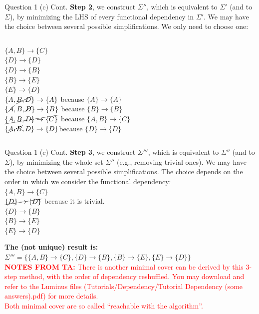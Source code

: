 \begin{frame}[fragile]{Question 1 (c) Cont.}
	\textbf{Step 2}, we construct $\Sigma''$, which is equivalent to $\Sigma'$ (and to $\Sigma$), by minimizing the LHS of every functional dependency in $\Sigma'$. We may have the choice between several possible simplifications. We only need to choose one:\\\vspace{3pt}
	\begin{columns}[t]
		$\{A, B\} \rightarrow \{C\}$\\
		$\{D\} \rightarrow \{D\}$\\
		$\{D\} \rightarrow \{B\}$\\
		$\{B\} \rightarrow \{E\}$\\
		$\{E\} \rightarrow \{D\}$\\
		$\{A, \cancel{B, D}\} \rightarrow \{A\}$ because $\{A\} \rightarrow \{A\}$\\	
		$\{\cancel{A}, B, \cancel{D}\} \rightarrow \{B\}$ because $\{B\} \rightarrow \{B\}$\\	
		$\cancel{\{A, B, D\} \rightarrow \{C\}}$ because $\{A, B\} \rightarrow \{C\}$\\	
		$\{\cancel{A, B}, D\} \rightarrow \{D\}$because $\{D\} \rightarrow \{D\}$\\
	\end{columns}
\end{frame}

\begin{frame}[fragile]{Question 1 (c) Cont.}
	\textbf{Step 3}, we construct $\Sigma'''$, which is equivalent to $\Sigma''$ (and to $\Sigma$), by minimizing the whole set $\Sigma''$ (e.g., removing trivial ones). We may have the choice between several possible simplifications. The choice depends on the order in which we consider the functional dependency:\\\vspace{3pt}
	$\{A, B\} \rightarrow \{C\}$\\
	$\cancel{\{D\} \rightarrow \{D\}}$ because it is trivial.\\
	$\{D\} \rightarrow \{B\}$\\
	$\{B\} \rightarrow \{E\}$\\
	$\{E\} \rightarrow \{D\}$\\\vspace{3pt}
	
	\textbf{The (not unique) result is:} \\\vspace{3pt}
	$\Sigma'''=\{\{A, B\} \rightarrow \{C\}, \{D\} \rightarrow \{B\}, \{B\} \rightarrow \{E\}, \{E\} \rightarrow \{D\}\}$
	\\\vspace{5pt}
	\textcolor{red}{\textbf{NOTES FROM TA:} There is another minimal cover can be derived by this 3-step method, with the order of dependency reshuffled. You may download and refer to the Luminus files (Tutorials/Dependency/Tutorial Dependency (some answers).pdf) for more details.\\Both minimal cover are so called ``reachable with the algorithm''.} 
\end{frame}

